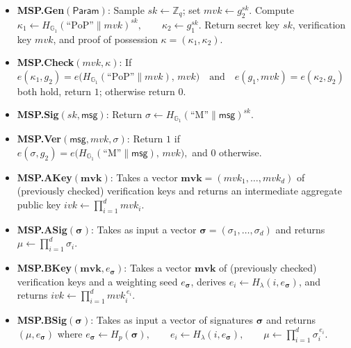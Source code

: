 \documentclass{article}
\begin{document}
\begin{itemize}
  \item \textbf{MSP.Gen}$(\mathsf{Param})$: Sample $sk\leftarrow \mathbb{Z}_q$; set $mvk \leftarrow g_2^{sk}$. Compute
  \(
    \kappa_1 \leftarrow H_{\mathbb{G}_1}(\text{``PoP''}\parallel mvk)^{sk},
    \qquad
    \kappa_2 \leftarrow g_1^{sk}.
  \)
  Return secret key $sk$, verification key $mvk$, and proof of possession $\kappa=(\kappa_1,\kappa_2)$.

  \item \textbf{MSP.Check}$(mvk,\kappa)$: If
  \(
    e(\kappa_1,g_2)=e\!\big(H_{\mathbb{G}_1}(\text{``PoP''}\parallel mvk),\, mvk\big)
    \quad\text{and}\quad
    e(g_1,mvk)=e(\kappa_2,g_2)
  \)
  both hold, return $1$; otherwise return $0$.

  \item \textbf{MSP.Sig}$(sk,\mathsf{msg})$: Return
  \(
    \sigma \leftarrow H_{\mathbb{G}_1}(\text{``M''}\parallel \mathsf{msg})^{sk}.
  \)

  \item \textbf{MSP.Ver}$(\mathsf{msg},mvk,\sigma)$: Return $1$ if
  \(
    e(\sigma,g_2)=e\!\big(H_{\mathbb{G}_1}(\text{``M''}\parallel \mathsf{msg}),\, mvk\big),
  \)
  and $0$ otherwise.

  \item \textbf{MSP.AKey}$(\mathbf{mvk})$: Takes a vector $\mathbf{mvk}=(mvk_1,\ldots,mvk_d)$ of (previously checked) verification keys and returns an intermediate aggregate public key
  \(
    ivk \leftarrow \prod_{i=1}^{d} mvk_i.
  \)

  \item \textbf{MSP.ASig}$(\boldsymbol{\sigma})$: Takes as input a vector $\boldsymbol{\sigma}=(\sigma_1,\ldots,\sigma_d)$ and returns
  \(
    \mu \leftarrow \prod_{i=1}^{d} \sigma_i.
  \)

  \item \textbf{MSP.BKey}$(\mathbf{mvk},e_{\boldsymbol{\sigma}})$: Takes a vector $\mathbf{mvk}$ of (previously checked) verification keys and a weighting seed $e_{\boldsymbol{\sigma}}$, derives $e_i\leftarrow H_\lambda(i,e_{\boldsymbol{\sigma}})$, and returns
  \(
    ivk \leftarrow \prod_{i=1}^{d} mvk_i^{\,e_i}.
  \)

  \item \textbf{MSP.BSig}$(\boldsymbol{\sigma})$: Takes as input a vector of signatures $\boldsymbol{\sigma}$ and returns $(\mu,e_{\boldsymbol{\sigma}})$ where
  \(
    e_{\boldsymbol{\sigma}} \leftarrow H_p(\boldsymbol{\sigma}),
    \qquad
    e_i \leftarrow H_\lambda(i,e_{\boldsymbol{\sigma}}),
    \qquad
    \mu \leftarrow \prod_{i=1}^{d} \sigma_i^{\,e_i}.
  \)
\end{itemize}
\end{document}
